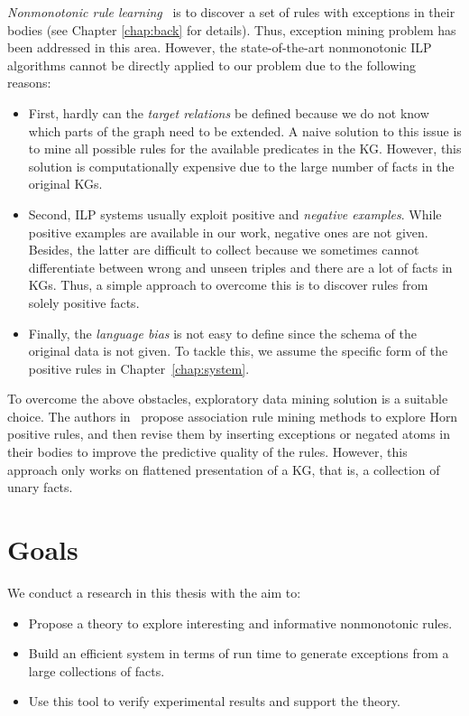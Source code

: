 \textit{Nonmonotonic rule learning}~\cite{ref11, ref40, ref41, ref32, ref42} is to discover a set of rules with exceptions in their bodies (see Chapter \ref{chap:back} for details). Thus, exception mining problem has been addressed in this area. However, the state-of-the-art nonmonotonic ILP algorithms cannot be directly applied to our problem due to the following reasons:
\begin{itemize}
\item First, hardly can the \textit{target relations} be defined because we do not know which parts of the graph need to be extended. A naive solution to this issue is to mine all possible rules for the available predicates in the KG. However, this solution is computationally expensive due to the large number of facts in the original KGs.
\item Second, ILP systems usually exploit positive and \textit{negative examples}. While positive examples are available in our work, negative ones are not given. Besides, the latter are difficult to collect because we sometimes cannot differentiate between wrong and unseen triples and there are a lot of facts in KGs. Thus, a simple approach to overcome this is to discover rules from solely positive facts.
\item Finally, the \textit{language bias} is not easy to define since the schema of the original data is not given. To tackle this, we assume the specific form of the positive rules in Chapter~\ref{chap:system}.
\end{itemize}

To overcome the above obstacles, exploratory data mining solution is a suitable choice. The authors in~\cite{ref12} propose association rule mining methods to explore Horn positive rules, and then revise them by inserting exceptions or negated atoms in their bodies to improve the predictive quality of the rules. However, this approach only works on flattened presentation of a KG, that is, a collection of unary facts.

\section{Goals}

We conduct a research in this thesis with the aim to:

\begin{itemize}
\item Propose a theory to explore interesting and informative nonmonotonic rules.
\item Build an efficient system in terms of run time to generate exceptions from a large collections of facts.
\item Use this tool to verify experimental results and support the theory.
\end{itemize}

